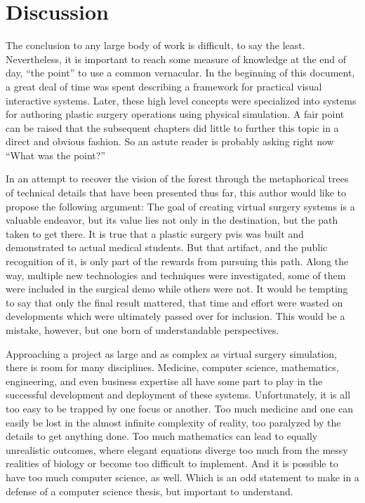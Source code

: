 
\chapter{Discussion}

The conclusion to any large body of work is difficult, to say the
least. Nevertheless, it is important to reach some measure of
knowledge at the end of day, ``the point'' to use a common
vernacular. In the beginning of this document, a great deal of time
was spent describing a framework for practical visual interactive
systems. Later, these high level concepts were specialized into
systems for authoring plastic surgery operations using physical
simulation. A fair point can be raised that the subsequent chapters
did little to further this topic in a direct and obvious fashion. So
an astute reader is probably asking right now ``What was the point?''

In an attempt to recover the vision of the forest through the
metaphorical trees of technical details that have been presented thus
far, this author would like to propose the following argument: The
goal of creating virtual surgery systems is a valuable endeavor, but
its value lies not only in the destination, but the path taken to get
there. It is true that a plastic surgery \gls{pvis} was built and
demonstrated to actual medical students. But that artifact, and the
public recognition of it, is only part of the rewards from pursuing
this path. Along the way, multiple new technologies and techniques
were investigated, some of them were included in the surgical demo
while others were not. It would be tempting to say that only the final
result mattered, that time and effort were wasted on developments
which were ultimately passed over for inclusion. This would be a
mistake, however, but one born of understandable perspectives.

Approaching a project as large and as complex as virtual surgery
simulation, there is room for many disciplines. Medicine, computer
science, mathematics, engineering, and even business expertise all
have some part to play in the successful development and deployment of
these systems. Unfortunately, it is all too easy to be trapped by one
focus or another. Too much medicine and one can easily be lost in the
almost infinite complexity of reality, too paralyzed by the details
to get anything done. Too much mathematics can lead to equally
unrealistic outcomes, where elegant equations diverge too much from
the messy realities of biology or become too difficult to
implement. And it is possible to have too much computer science, as
well. Which is an odd statement to make in a defense of a computer
science thesis, but important to understand.

